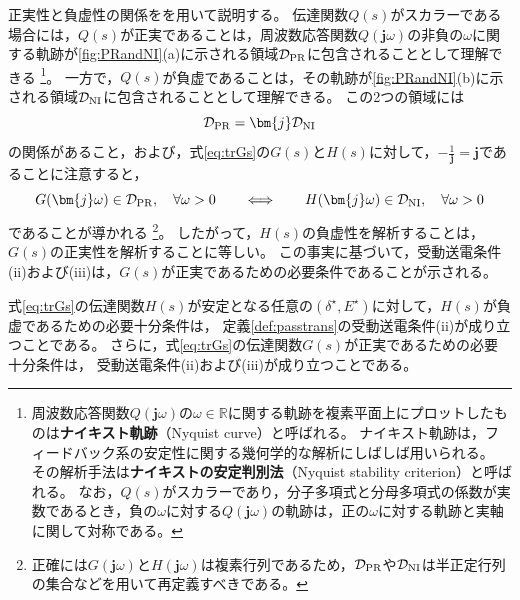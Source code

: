 \documentclass[tombow,dvipdfmx]{corona-a5-1.1}
\begin{document}
正実性と負虚性の関係をを用いて説明する。
伝達関数$Q(s)$がスカラーである場合には，$Q(s)$が正実であることは，周波数応答関数$Q(\bm{j} \omega)$の非負の$\omega$に関する軌跡が\ref{fig:PRandNI}(a)に示される領域$\mathcal{D}_{\rm PR}$に包含されることとして理解できる
\footnote{
周波数応答関数$Q(\bm{j} \omega)$の$\omega \in \mathbb{R}$に関する軌跡を複素平面上にプロットしたものは\textbf{ナイキスト軌跡}（Nyquist curve）と呼ばれる。
ナイキスト軌跡は，フィードバック系の安定性に関する幾何学的な解析にしばしば用いられる。
その解析手法は\textbf{ナイキストの安定判別法}（Nyquist stability criterion）と呼ばれる。
なお，$Q(s)$がスカラーであり，分子多項式と分母多項式の係数が実数であるとき，負の$\omega$に対する$Q(\bm{j} \omega)$の軌跡は，正の$\omega$に対する軌跡と実軸に関して対称である。
}。
一方で，$Q(s)$が負虚であることは，その軌跡が\ref{fig:PRandNI}(b)に示される領域$\mathcal{D}_{\rm NI}$に包含されることとして理解できる。
この2つの領域には
\[
\mathcal{D}_{\rm PR} = \bm{j} \mathcal{D}_{\rm NI}
\]
の関係があること，および，式\ref{eq:trGs}の$G(s)$と$H(s)$に対して，$-\tfrac{1}{\bm{j}}=\bm{j}$であることに注意すると，
\[
G(\bm{j} \omega) \in \mathcal{D}_{\rm PR}, 
\quad \forall \omega >0
\qquad
\Longleftrightarrow
\qquad
H(\bm{j} \omega) \in \mathcal{D}_{\rm NI} ,
\quad \forall \omega >0
\]
であることが導かれる
\footnote{
正確には$G(\bm{j} \omega)$と$H(\bm{j} \omega)$は複素行列であるため，$\mathcal{D}_{\rm PR}$や$\mathcal{D}_{\rm NI}$は半正定行列の集合などを用いて再定義すべきである。
}。
したがって，$H(s)$の負虚性を解析することは，$G(s)$の正実性を解析することに等しい。
この事実に基づいて，受動送電条件(ii)および(iii)は，$G(s)$が正実であるための必要条件であることが示される。

\begin{定理}[電気サブシステムの伝達関数の正実性]
\label{thm:EdynNI}
式\ref{eq:trGs}の伝達関数$H(s)$が安定となる任意の$(\delta^{\star},E^{\star})$に対して，$H(s)$が負虚であるための必要十分条件は，
定義\ref{def:passtrans}の受動送電条件(ii)が成り立つことである。
さらに，式\ref{eq:trGs}の伝達関数$G(s)$が正実であるための必要十分条件は，
受動送電条件(ii)および(iii)が成り立つことである。
\end{定理}
\end{document}

